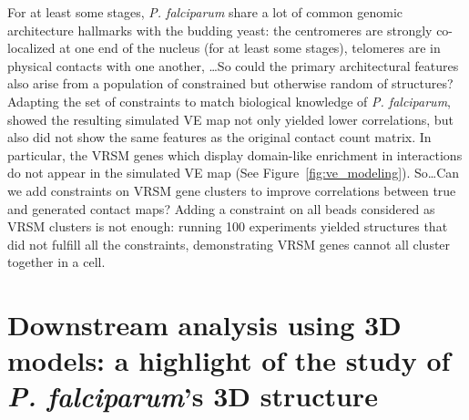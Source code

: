 \documentclass[2columns]{article}
\begin{document}
For at least some stages, {\em P. falciparum} share a lot of common genomic
architecture hallmarks with the budding yeast: the centromeres are strongly
co-localized at one end of the nucleus (for at least some stages),
telomeres are in physical contacts with one another,
\dots So could the primary architectural features also arise from a population
of constrained but otherwise random of structures? Adapting the set of
constraints to match biological knowledge of {\em P. falciparum},
\citet{ay:three-dimensional} showed the resulting simulated VE map not only
yielded lower correlations, but also did not show the same features as the
original contact count matrix. In particular, the VRSM genes which display
domain-like enrichment in interactions do not appear in the simulated VE map
(See Figure~\ref{fig:ve_modeling}). So\dots Can we add constraints on VRSM
gene clusters to improve correlations between true and generated contact maps?
Adding a constraint on all beads considered as VRSM clusters is not enough:
running 100 experiments yielded structures that did not fulfill all the
constraints, demonstrating VRSM genes cannot all cluster together in a cell.

\section*{Downstream analysis using 3D models: a highlight of the study of
{\em P. falciparum}'s 3D structure}
\end{document}
